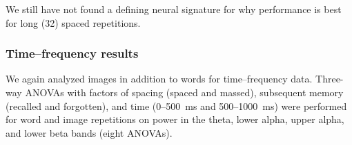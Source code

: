 
We still have not found a defining neural signature for why performance is best for long (32) spaced repetitions.

\subsubsection{Time--frequency results}

We again analyzed images in addition to words for time--frequency data.
Three-way ANOVAs with factors of spacing (spaced and massed), subsequent memory (recalled and forgotten), and time (0--500~ms and 500--1000~ms) were performed for word and image repetitions on power in the theta, lower alpha, upper alpha, and lower beta bands (eight ANOVAs).


